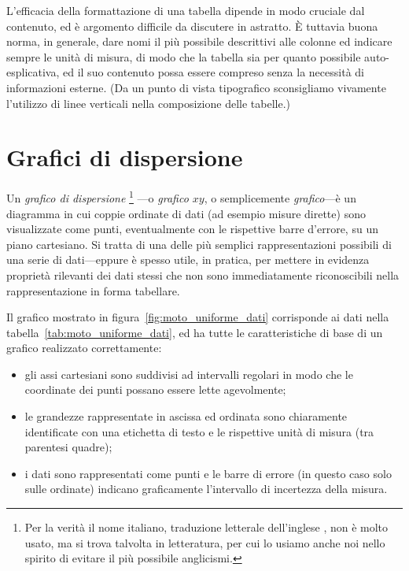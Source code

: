 L'efficacia della formattazione di una tabella dipende in modo cruciale dal
contenuto, ed è argomento difficile da discutere in astratto. \`E tuttavia
buona norma, in generale, dare nomi il più possibile descrittivi alle colonne
ed indicare sempre le unità di misura, di modo che la tabella sia per quanto
possibile auto-esplicativa, ed il suo contenuto possa essere compreso senza
la necessità di informazioni esterne. (Da un punto di vista tipografico
sconsigliamo vivamente l'utilizzo di linee verticali nella composizione delle
tabelle.)


\section{Grafici di dispersione}

Un \emph{grafico di dispersione}%
\footnote{Per la verità il nome italiano, traduzione letterale dell'inglese
  , non è molto usato, ma si trova talvolta in
  letteratura, per cui lo usiamo anche noi nello spirito di evitare il più
  possibile anglicismi.}%
---o \emph{grafico $xy$}, o semplicemente \emph{grafico}---è un diagramma in
cui coppie ordinate di dati (ad esempio misure dirette) sono visualizzate come
punti, eventualmente con le rispettive barre d'errore, su un piano cartesiano.
Si tratta di una delle più semplici rappresentazioni possibili di una serie
di dati---eppure è spesso utile, in pratica, per mettere in evidenza
proprietà rilevanti dei dati stessi che non sono immediatamente riconoscibili
nella rappresentazione in forma tabellare.


Il grafico mostrato in figura~\ref{fig:moto_uniforme_dati} corrisponde ai dati
nella tabella~\ref{tab:moto_uniforme_dati}, ed ha tutte le caratteristiche
di base di un grafico realizzato correttamente:
\begin{itemize}
\item gli assi cartesiani sono suddivisi ad intervalli regolari in modo che
  le coordinate dei punti possano essere lette agevolmente;
\item le grandezze rappresentate in ascissa ed ordinata sono
  chiaramente identificate con una etichetta di testo e le rispettive unità di
  misura (tra parentesi quadre);
\item i dati sono rappresentati come punti e le barre di errore (in questo caso
  solo sulle ordinate) indicano graficamente l'intervallo di incertezza della
  misura.
\end{itemize}

